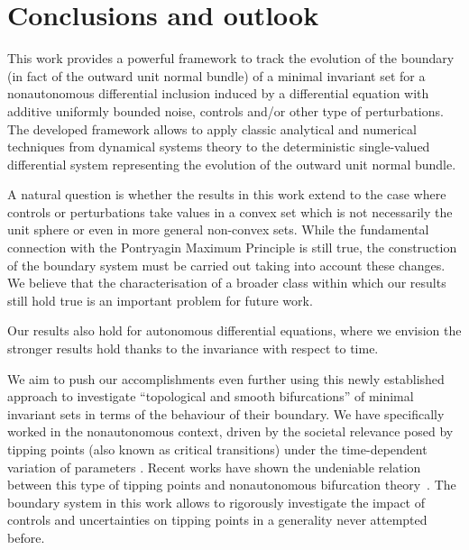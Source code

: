 \documentclass[reqno]{amsart}
\theoremstyle{definition}
\numberwithin{equation}{section}
\begin{document}
\section{Conclusions and outlook}
This work provides a powerful framework to track the evolution of the boundary (in fact of the outward unit normal bundle) of a minimal invariant set for a nonautonomous differential inclusion induced by a differential equation with additive uniformly bounded noise, controls and/or other type of perturbations. The developed framework  allows to apply classic analytical and numerical techniques from dynamical systems theory to the deterministic single-valued differential system representing the evolution of the outward unit normal bundle. \par\smallskip

A natural question is whether the results in this work extend to the case where controls or perturbations take values in a convex set which is not necessarily the unit sphere or even in more general non-convex sets. While the fundamental connection with the Pontryagin Maximum Principle is still true, the construction of the boundary system must be carried out taking into account these changes. We believe that the characterisation of a broader class within which our results still hold true is an important problem for future work.    \par\smallskip

Our results also hold for autonomous differential equations, where we envision the stronger results hold thanks to the invariance with respect to time. \par\smallskip

We aim to push our accomplishments even further using this newly established approach to investigate ``topological and smooth bifurcations'' of minimal invariant sets in terms of the behaviour of their boundary. 
We have specifically worked in the nonautonomous context, driven by the societal relevance posed by tipping points (also known as critical transitions) under the time-dependent variation of parameters \cite{ashwin2012tipping}. Recent works \cite{duenas2023rate,duenas2023critical,duenas2024concave,duenas2024critical,kuehn2022estimating, longo2021rate, longo2024critical1, longo2024critical} have shown the undeniable relation between this type of tipping points and nonautonomous bifurcation theory~\cite{anagnostopoulou2023nonautonomous}. The boundary system in this work allows to rigorously investigate the impact of controls and uncertainties on tipping points in a generality never attempted before.\par\smallskip
\end{document}
